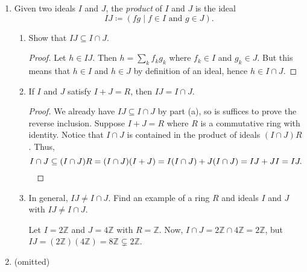 \documentclass[11pt,oneside,english]{amsart}
\theoremstyle{definition}
\newcommand{\lspace}{\vspace{5mm}}
\newcommand{\MB}[1]{\mathbb{#1}}
\begin{document}
\rightline{\today}

\lspace




\begin{enumerate}[leftmargin=*]
\itemsep5mm



\item Given two ideals $I$ and $J$, the \textit{product} of $I$ and $J$ is the ideal
\[
IJ \coloneqq \left( fg \mid f \in I \text{ and } g \in J \right).
\]
\begin{enumerate}
\itemsep5mm
\item Show that $IJ \subseteq I \cap J$.

\begin{proof}
Let $h\in IJ$. Then $h=\sum_kf_kg_k$ where $f_k\in I$ and $g_k\in J$. But this means that $h\in I$ and $h\in J$ by definition of an ideal, hence $h\in I\cap J$.
\end{proof}

\item If $I$ and $J$ satisfy $I+J = R$, then $IJ = I \cap J$.

\begin{proof}
We already have $IJ \subseteq I \cap J$ by part (a), so is suffices to prove the reverse inclusion. Suppose $I+J=R$ where $R$ is a commutative ring with identity. Notice that $I\cap J$ is contained in the product of ideals $(I\cap J)R$. Thus,
\[
I\cap J\subseteq (I\cap J)R=(I\cap J)(I+J)=I(I\cap J)+J(I\cap J)=IJ+JI=IJ.\qedhere
\]\
\end{proof}

\item In general, $IJ \neq I \cap J$. Find an example of a ring $R$ and ideals $I$ and $J$ with $IJ \neq I \cap J$.

Let $I=2\MB{Z}$ and $J=4\MB{Z}$ with $R=\MB{Z}$. Now, $I\cap J=2\MB{Z}\cap4\MB{Z}=2\MB{Z}$, but $IJ=(2\MB{Z})(4\MB{Z})=8\MB{Z}\subsetneq2\MB{Z}$.
\end{enumerate}



\item (omitted)

%



\end{enumerate}
\end{document}
